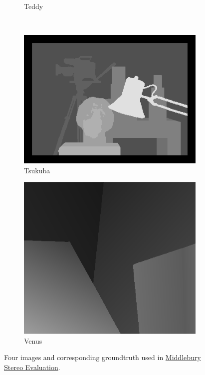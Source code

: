 \documentclass[letterpaper,12pt]{article}
\begin{document}
\begin{figure}
\begin{subfigure}[b]{0.2\textwidth}
                \caption{Teddy}
                \label{fig:teddy}
        \end{subfigure}
        \quad
        ~ %
        \begin{subfigure}[b]{0.2\textwidth}
                \includegraphics[width=\textwidth]{tsukubaGT.png}
                \caption{Tsukuba}
                \label{fig:tsukuba}
        \end{subfigure}
        \quad
        \begin{subfigure}[b]{0.2\textwidth}
                \includegraphics[width=\textwidth]{venusGT.png}
                \caption{Venus}
                \label{fig:venus}
        \end{subfigure}
        \caption{Four images and corresponding groundtruth used in \href{http://vision.middlebury.edu/stereo/}{Middlebury Stereo Evaluation}.}\label{fig:stereoeval}
\end{figure}
\end{document}
